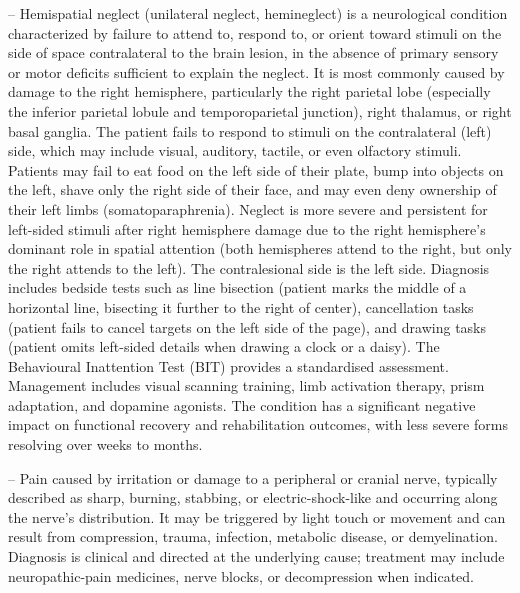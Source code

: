-- Hemispatial neglect (unilateral neglect, hemineglect) is a neurological condition characterized by failure to attend to, respond to, or orient toward stimuli on the side of space contralateral to the brain lesion, in the absence of primary sensory or motor deficits sufficient to explain the neglect. It is most commonly caused by damage to the right hemisphere, particularly the right parietal lobe (especially the inferior parietal lobule and temporoparietal junction), right thalamus, or right basal ganglia. The patient fails to respond to stimuli on the contralateral (left) side, which may include visual, auditory, tactile, or even olfactory stimuli. Patients may fail to eat food on the left side of their plate, bump into objects on the left, shave only the right side of their face, and may even deny ownership of their left limbs (somatoparaphrenia). Neglect is more severe and persistent for left-sided stimuli after right hemisphere damage due to the right hemisphere's dominant role in spatial attention (both hemispheres attend to the right, but only the right attends to the left). The contralesional side is the left side. Diagnosis includes bedside tests such as line bisection (patient marks the middle of a horizontal line, bisecting it further to the right of center), cancellation tasks (patient fails to cancel targets on the left side of the page), and drawing tasks (patient omits left-sided details when drawing a clock or a daisy). The Behavioural Inattention Test (BIT) provides a standardised assessment. Management includes visual scanning training, limb activation therapy, prism adaptation, and dopamine agonists. The condition has a significant negative impact on functional recovery and rehabilitation outcomes, with less severe forms resolving over weeks to months.

-- Pain caused by irritation or damage to a peripheral or cranial nerve, typically described as sharp, burning, stabbing, or electric-shock-like and occurring along the nerve’s distribution. It may be triggered by light touch or movement and can result from compression, trauma, infection, metabolic disease, or demyelination. Diagnosis is clinical and directed at the underlying cause; treatment may include neuropathic-pain medicines, nerve blocks, or decompression when indicated.

